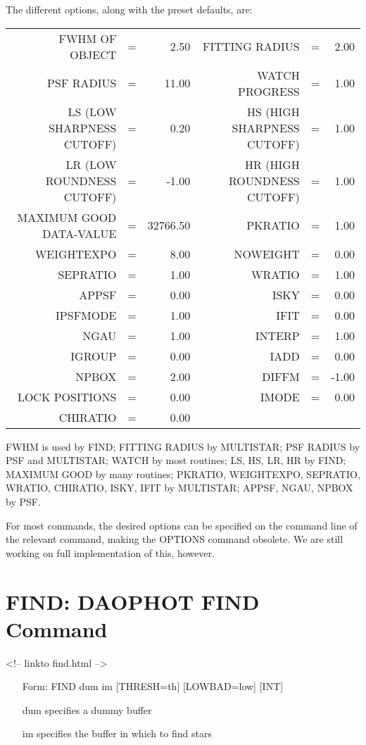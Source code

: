The different options, along with the preset defaults, are:
\begin{tabular}{rcrrcr}
             FWHM OF OBJECT&=&    2.50&                FITTING RADIUS&=&2.00\\
                 PSF RADIUS&=&   11.00&                WATCH PROGRESS&=&1.00\\
  LS (LOW SHARPNESS CUTOFF)&=&    0.20&    HS (HIGH SHARPNESS CUTOFF)&=&1.00\\
  LR (LOW ROUNDNESS CUTOFF)&=&   -1.00&    HR (HIGH ROUNDNESS CUTOFF)&=&1.00\\
    MAXIMUM GOOD DATA-VALUE&=&32766.50&                       PKRATIO&=&1.00\\
                 WEIGHTEXPO&=&    8.00&                      NOWEIGHT&=&0.00\\
                   SEPRATIO&=&    1.00&                        WRATIO&=&1.00\\
                      APPSF&=&    0.00&                          ISKY&=&0.00\\
                   IPSFMODE&=&    1.00&                          IFIT&=&0.00\\
                       NGAU&=&    1.00&                        INTERP&=&1.00\\
                     IGROUP&=&    0.00&                          IADD&=&0.00\\
                      NPBOX&=&    2.00&                         DIFFM&=&-1.00\\
             LOCK POSITIONS&=&    0.00&                         IMODE&=&0.00\\
                   CHIRATIO&=&    0.00&
\end{tabular}

FWHM is used by FIND; FITTING RADIUS by MULTISTAR; PSF RADIUS by PSF and
MULTISTAR; WATCH by most routines; LS, HS, LR, HR by FIND; MAXIMUM GOOD by
many routines; PKRATIO, WEIGHTEXPO, SEPRATIO, WRATIO, CHIRATIO, ISKY, IFIT by 
MULTISTAR; APPSF, NGAU, NPBOX by PSF.

For most commands, the desired options can be specified on the command line
of the relevant command, making the OPTIONS command obsolete. We are still
working on full implementation of this, however.

\section{FIND: DAOPHOT FIND Command}
\begin{rawhtml}
<!-- linkto find.html -->
\end{rawhtml}
\begin{itemize}
  \item[Form: FIND dum im {[THRESH=th]} {[LOWBAD=low]} {[INT]}\hfill]{}
  \item[dum]{specifies a dummy buffer}
  \item[im]{specifies the buffer in which to find stars}
\end{itemize}

